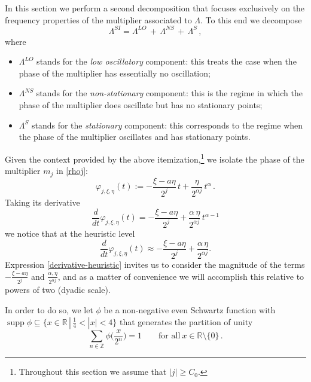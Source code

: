 \documentclass[a4paper,reqno]{amsart}
\numberwithin{equation}{section}
\theoremstyle{definition}
\newcommand{\R}{\mathbb{R}}
\newcommand{\Z}{\mathbb{Z}}
\def\a{\alpha}
\def\L{\Lambda}
\DeclareMathOperator{\supp}{supp}
\begin{document}
In this section we perform a second decomposition that focuses exclusively on the frequency properties of the multiplier associated to $\L$. To this end we decompose
\begin{equation}\label{keydec}
	\L^{SI}=\L^{LO}\,+\,\L^{NS}\,+\,\L^{S}\,,
\end{equation}
where
\begin{itemize}
	
\item $\L^{LO}$ stands for the \emph{low oscillatory} component: this treats the case when the phase of the multiplier has essentially no oscillation;
	
\item $\L^{NS}$ stands for the \emph{non-stationary} component: this is the regime in which the phase of the multiplier does oscillate but has no stationary points;
	
\item $\L^{S}$ stands for the \emph{stationary} component: this corresponds to the regime when the phase of the multiplier oscillates and has stationary points.
\end{itemize}

Given the context provided by the above itemization,\footnote{Throughout this section we assume that $|j|\geq C_0$.} we isolate the phase of the multiplier $m_j$ in \eqref{rhoj}:
\begin{equation}\label{phasefunction}
	\varphi_{j,\xi,\eta}(t):=-\frac{\xi-a\eta}{2^j}\,t + \frac{\eta}{2^{\a j}}\,t^\a\,.
\end{equation}
Taking its derivative
\begin{equation*}
	\frac{d}{dt}\varphi_{j,\xi,\eta}(t)=-\frac{\xi-a\eta}{2^j}+\frac{\a\,\eta}{2^{\a j}}\,t^{\a-1}
\end{equation*}
we notice that at the heuristic level
\begin{equation}\label{derivative-heuristic}
	\frac{d}{dt}\varphi_{j,\xi,\eta}(t)\approx -\frac{\xi-a\eta}{2^j}+\frac{\a\,\eta}{2^{\a j}}.
\end{equation}
Expression \eqref{derivative-heuristic} invites us to consider the magnitude of the terms $-\frac{\xi-a\eta}{2^j}$ and $\frac{\a,\eta}{2^{\a j}}$, and as a matter of convenience we will accomplish this relative to powers of two (dyadic scale).

In order to do so, we let $\phi$ be a non-negative even Schwartz function with $\supp\phi\subseteq\{x\in\R\,|\,\frac{1}{4}<|x|<4\}$ that generates the partition of unity
\begin{equation}\label{ref:unity-phi}
	\sum_{n\in\Z}\phi\Big(\frac{x}{2^n}\Big)=1\qquad\textrm{for all}\:x\in\R\setminus\{0\}\,.
\end{equation}
\end{document}
